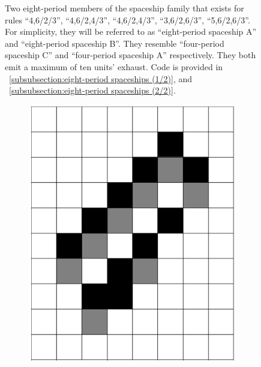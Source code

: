 \documentclass[12pt]{article}
\numberwithin{figure}{section} %
\begin{document}
\begin{figure}[H]
\begin{subfigure}{0.3\textwidth}
     		\subcaption{}
   	\end{subfigure}
   	\setcounter{subfigure}{0}
   	\caption[Eight-period spaceships]{Two eight-period members of the spaceship family that exists for rules “4,6/2/3”, “4,6/2,4/3”, “4,6/2,4/3”, “3,6/2,6/3”, “5,6/2,6/3”. For simplicity, they will be referred to as “eight-period spaceship A” and “eight-period spaceship B”. They resemble “four-period spaceship C” and “four-period spaceship A” respectively. They both emit a maximum of ten units’ exhaust.  Code is provided in ~\ref{subsubsection:eight-period spaceships (1/2)}, and ~\ref{subsubsection:eight-period spaceships (2/2)}. }
   	\label{fig:eight-period spaceships}
   	\vspace{-1.5em}
\end{figure}

\begin{figure}[H]
	\centering
 	\begin{subfigure}{0.2\textwidth}
     		\centering
     		\includegraphics[angle=270,width=\linewidth]{Section4/24.0}
     		\subcaption{}
   	\end{subfigure}

\end{figure}
\end{document}
